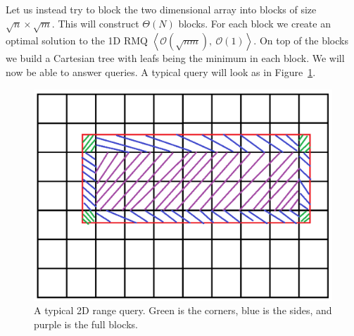 \documentclass[a4paper,oneside,article,11pt]{memoir}
\begin{document}
Let us instead try to block the two dimensional array into blocks of size $\sqrt{n} \times \sqrt{m}$. This will construct $\Theta(N)$ blocks. For each block we create an optimal solution to the 1D RMQ $\left\langle \mathcal{O}(\sqrt{nm}),\ \mathcal{O}(1)\right\rangle$. On top of the blocks we build a Cartesian tree with leafs being the minimum in each block.
We will now be able to answer queries. A typical query will look as in Figure~\ref{fig:rmq_query}.

\begin{figure}[h!]
\includegraphics[width=\textwidth]{../figures/rmq_query.png}
\caption{\label{fig:rmq_query}A typical 2D range query. Green is the corners, blue is the sides, and purple is the full blocks.}
\end{figure}
\end{document}
